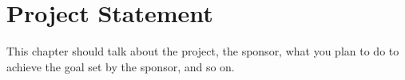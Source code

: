 \chapter{Project Statement}
\label{ch:project-statement}

This chapter should talk about the project, the sponsor, what you plan
to do to achieve the goal set by the sponsor, and so on.


